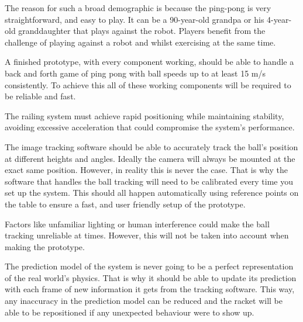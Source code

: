 The reason for such a broad demographic is because the ping-pong is very straightforward, and easy to play. It can be a 90-year-old grandpa or his 4-year-old granddaughter that plays against the robot. Players benefit from the challenge of playing against a robot and whilst exercising at the same time.

A finished prototype, with every component working, should be able to handle a back and forth game of ping pong with ball speeds up to at least 15 m/s consistently. To achieve this all of these working components will be required to be reliable and fast.

The railing system must achieve rapid positioning while maintaining stability, avoiding excessive acceleration that could compromise the system's performance.

The image tracking software should be able to accurately track the ball's position at different heights and angles. Ideally the camera will always be mounted at the exact same position. However, in reality this is never the case. That is why the software that handles the ball tracking will need to be calibrated every time you set up the system. This should all happen automatically using reference points on the table to ensure a fast, and user friendly setup of the prototype.

Factors like unfamiliar lighting or human interference could make the ball tracking unreliable at times. However, this will not be taken into account when making the prototype.

The prediction model of the system is never going to be a perfect representation of the real world's physics. That is why it should be able to update its prediction with each frame of new information it gets from the tracking software. This way, any inaccuracy in the prediction model can be reduced and the racket will be able to be repositioned if any unexpected behaviour were to show up.
